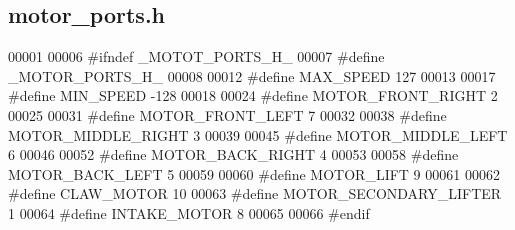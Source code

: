 \subsection{motor\+\_\+ports.\+h}
\label{a00050_source}

\begin{DoxyCode}
00001 
00006 \textcolor{preprocessor}{#ifndef \_MOTOT\_PORTS\_H\_}
00007 \textcolor{preprocessor}{#define \_MOTOR\_PORTS\_H\_}
00008 
00012 \textcolor{preprocessor}{#define MAX\_SPEED 127}
00013 
00017 \textcolor{preprocessor}{#define MIN\_SPEED -128}
00018 
00024 \textcolor{preprocessor}{#define MOTOR\_FRONT\_RIGHT 2}
00025 
00031 \textcolor{preprocessor}{#define MOTOR\_FRONT\_LEFT 7}
00032 
00038 \textcolor{preprocessor}{#define MOTOR\_MIDDLE\_RIGHT 3}
00039 
00045 \textcolor{preprocessor}{#define MOTOR\_MIDDLE\_LEFT 6}
00046 
00052 \textcolor{preprocessor}{#define MOTOR\_BACK\_RIGHT 4}
00053 
00058 \textcolor{preprocessor}{#define MOTOR\_BACK\_LEFT 5}
00059 
00060 \textcolor{preprocessor}{#define MOTOR\_LIFT 9}
00061 
00062 \textcolor{preprocessor}{#define CLAW\_MOTOR 10}
00063 \textcolor{preprocessor}{#define MOTOR\_SECONDARY\_LIFTER 1}
00064 \textcolor{preprocessor}{#define INTAKE\_MOTOR 8}
00065 
00066 \textcolor{preprocessor}{#endif}
\end{DoxyCode}
